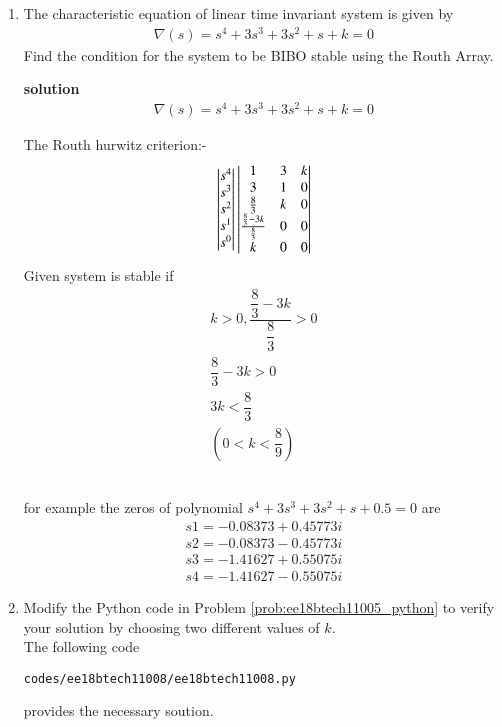 \begin{enumerate}[label=\thesubsection.\arabic*.,ref=\thesubsection.\theenumi]
\item 
The characteristic equation of linear time invariant system is given by
\begin{align} 
\nabla(s)=s^4+3s^3+3s^2+s+k=0
\end{align}
Find the condition for the system to be BIBO stable using the Routh Array.

\textbf{solution}
\begin{align}
\nabla(s)=s^4+3s^3+3s^2+s+k=0
\end{align}

The Routh hurwitz criterion:-
\bigskip
\begin{align}
\begin{vmatrix}s^4\\s^3\\s^2\\s^1 \\ s^0\end{vmatrix}
\begin{vmatrix}1 & 3 & k \\ 3 & 1 & 0\\  \frac{8}{3}& k & 0\\ \frac{\frac{8}{3}-3k}{\frac{8}{3}} & 0 & 0\\k & 0 & 0\end{vmatrix} 
\end{align}
Given system is stable if
\begin{align}
k>0 ,  \dfrac{\dfrac{8}{3}-3k}{\dfrac{8}{3}}>0    
\\
{\dfrac{8}{3}-3k} >0
\\
3k<\dfrac{8}{3}
\\
(0<k<\dfrac{8}{9})
\end{align}

\\for example the zeros of polynomial $s^4+3s^3+3s^2+s+0.5=0$ are 
\begin{align}
s1=-0.08373+0.45773i
\\
s2=-0.08373-0.45773i
\\
s3=-1.41627+0.55075i
\\
s4=-1.41627-0.55075i
\end{align}

\item Modify the Python code in Problem \ref{prob:ee18btech11005_python} to verify your solution by choosing two different values of $k$.
\label{prob:ee18btech11008_python}
\\
\solution 
The following code 
%
\begin{lstlisting}
codes/ee18btech11008/ee18btech11008.py
\end{lstlisting}
%
provides the necessary soution.


\end{enumerate}

